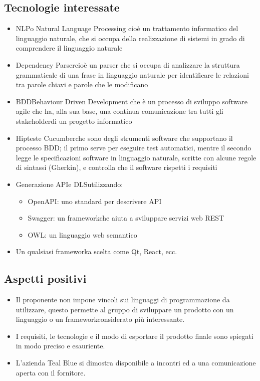 \subsection{Tecnologie interessate}
\begin{itemize}
	\item NLP\glosp o Natural Language Processing cioè un trattamento informatico del linguaggio naturale, che si occupa della realizzazione di sistemi in grado di comprendere il linguaggio naturale	
	\item Dependency Parser\glosp cioè un parser che si occupa di analizzare la struttura grammaticale di una frase in linguaggio naturale per identificare le relazioni tra parole chiavi e parole che le modificano
	\item BDD\glosp Behaviour Driven Development che è un processo di sviluppo software agile che ha, alla sua base, una continua comunicazione tra tutti gli stakeholder\glosp di un progetto informatico
	\item Hiptest\glosp e Cucumber\glosp che sono degli strumenti software che supportano il processo BDD\glo; il primo serve per eseguire test automatici, mentre il secondo legge le specificazioni software in linguaggio naturale, scritte con alcune regole di sintassi (Gherkin\glo), e controlla che il software rispetti i requisiti
	\item Generazione API\glosp e DLS\glosp utilizzando:
	\begin{itemize}
		\item OpenAPI\glo: uno standard per descrivere API\glosp
		\item Swagger\glo: un framework\glosp che aiuta a sviluppare servizi web REST\glosp
		\item OWL\glo: un linguaggio web semantico
	\end{itemize}
	\item Un qualsiasi framework\glosp a scelta come Qt\glo, React\glo, ecc.
\end{itemize} 
\subsection{Aspetti positivi}
\begin{itemize} 
	\item Il proponente non impone vincoli sui linguaggi di programmazione da utilizzare, questo permette  al gruppo di sviluppare un prodotto con un linguaggio o un framework\glosp considerato più interessante. 
	\item I requisiti, le tecnologie e il modo di esportare il prodotto finale sono spiegati in modo preciso e esauriente.
	\item L'azienda Teal Blue si dimostra disponibile a incontri ed a una comunicazione aperta con il fornitore.
\end{itemize}
